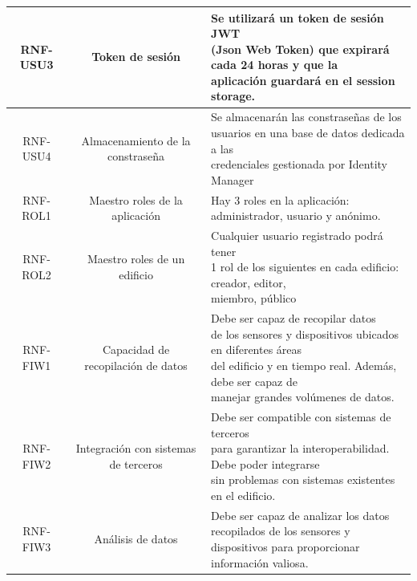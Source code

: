 \documentclass[12pt, a4paper, twoside]{article}
\begin{document}
{\begin{longtable}{ |c|c|l| }
  RNF-USU3 & Token de sesión 
  & \makecell[l]{Se utilizará un token de sesión JWT \\
  (Json Web Token) que expirará cada 24 horas y que la \\
  aplicación guardará en el session storage.
   } \\ \hline
   
  RNF-USU4 & Almacenamiento de la constraseña 
  & \makecell[l]{Se almacenarán las constraseñas de los \\
  usuarios en una base de datos dedicada a las \\
  credenciales gestionada por Identity Manager
  } \\ \hline 
  RNF-ROL1 & Maestro roles de la aplicación 
  & \makecell[l]{Hay 3 roles en la aplicación: \\
  administrador, usuario y anónimo.
  } \\ \hline
  RNF-ROL2 & Maestro roles de un edificio 
  & \makecell[l]{Cualquier usuario registrado podrá tener \\
  1 rol de los siguientes en cada edificio:  creador, editor,\\
  miembro, público
  } \\ \hline

  RNF-FIW1 & Capacidad de recopilación de datos 
  & \makecell[l]{Debe ser capaz de recopilar datos \\
  de los sensores y dispositivos ubicados en diferentes áreas \\
  del edificio y en tiempo real. Además, debe ser capaz de\\
  manejar grandes volúmenes de datos.
  } \\ \hline
  RNF-FIW2 & Integración con sistemas de terceros 
  & \makecell[l]{Debe ser compatible con sistemas de terceros\\
  para garantizar la interoperabilidad. Debe poder integrarse\\
  sin problemas con sistemas existentes en el edificio.
  } \\ \hline
  RNF-FIW3 & Análisis de datos
  & \makecell[l]{Debe ser capaz de analizar los datos\\
  recopilados de los sensores y dispositivos para proporcionar\\
  información valiosa.
  } \\ \hline


\end{longtable}}
\end{document}
